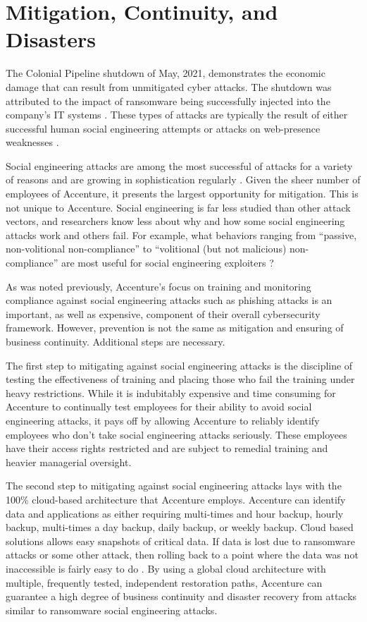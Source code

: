 \section{Mitigation, Continuity, and Disasters}

The Colonial Pipeline shutdown of May, 2021, demonstrates the economic damage that can result from unmitigated cyber attacks. The shutdown was attributed to the impact of ransomware being successfully injected into the company's IT systems \parencite{sangerCyberattackForcesShutdown2021}. These types of attacks are typically the result of either successful human social engineering attempts or attacks on web-presence weaknesses \parencite{sultanSurveyRansomewareEvolution2018}.

Social engineering attacks are among the most successful of attacks for a variety of reasons and are growing in sophistication regularly \parencite{krombholzAdvancedSocialEngineering2015}. Given the sheer number of employees of Accenture, it presents the largest opportunity for mitigation. This is not unique to Accenture. Social engineering is far less studied than other attack vectors, and researchers know less about why and how some social engineering attacks work and others fail. For example, what behaviors ranging from ``passive, non-volitional non-compliance'' to ``volitional (but not malicious) non-compliance'' are most useful for social engineering exploiters \parencite{dalalOrganizationalScienceCybersecurity2021}?

As was noted previously, Accenture's focus on training and monitoring compliance against social engineering attacks such as phishing attacks is an important, as well as expensive, component of their overall cybersecurity framework. However, prevention is not the same as mitigation and ensuring of business continuity. Additional steps are necessary.

The first step to mitigating against social engineering attacks is the discipline of testing the effectiveness of training and placing those who fail the training under heavy restrictions. While it is indubitably expensive and time consuming for Accenture to continually test employees for their ability to avoid social engineering attacks, it pays off by allowing Accenture to reliably identify employees who don't take social engineering attacks seriously. These employees have their access rights restricted and are subject to remedial training and heavier managerial oversight.

The second step to mitigating against social engineering attacks lays with the 100\% cloud-based architecture that Accenture employs. Accenture can identify data and applications as either requiring multi-times and hour backup, hourly backup, multi-times a day backup, daily backup, or weekly backup. Cloud based solutions allows easy snapshots of critical data. If data is lost due to ransomware attacks or some other attack, then rolling back to a point where the data was not inaccessible is fairly easy to do \parencite{amazonawsAmazonEBSFast2021}. By using a global cloud architecture with multiple, frequently tested, independent restoration paths, Accenture can guarantee a high degree of business continuity and disaster recovery from attacks similar to ransomware social engineering attacks.


